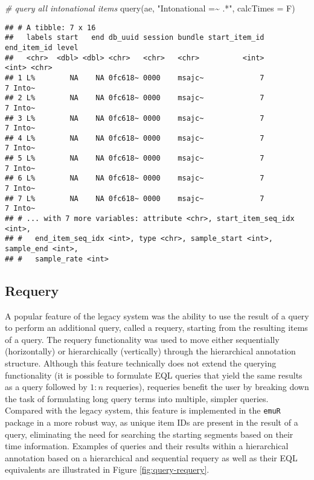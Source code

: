 \documentclass[
]{book}
\newenvironment{Shaded}{\begin{snugshade}}{\end{snugshade}}
\newcommand{\AttributeTok}[1]{\textcolor[rgb]{0.77,0.63,0.00}{#1}}
\newcommand{\CommentTok}[1]{\textcolor[rgb]{0.56,0.35,0.01}{\textit{#1}}}
\newcommand{\FunctionTok}[1]{\textcolor[rgb]{0.00,0.00,0.00}{#1}}
\newcommand{\NormalTok}[1]{#1}
\newcommand{\StringTok}[1]{\textcolor[rgb]{0.31,0.60,0.02}{#1}}
\begin{document}
\begin{Shaded}
\begin{Highlighting}[]
\CommentTok{\# query all intonational items}
\FunctionTok{query}\NormalTok{(ae, }\StringTok{"Intonational =\textasciitilde{} .*"}\NormalTok{, }\AttributeTok{calcTimes =}\NormalTok{ F)}
\end{Highlighting}
\end{Shaded}

\begin{verbatim}
## # A tibble: 7 x 16
##   labels start   end db_uuid session bundle start_item_id end_item_id level
##   <chr>  <dbl> <dbl> <chr>   <chr>   <chr>          <int>       <int> <chr>
## 1 L%        NA    NA 0fc618~ 0000    msajc~             7           7 Into~
## 2 L%        NA    NA 0fc618~ 0000    msajc~             7           7 Into~
## 3 L%        NA    NA 0fc618~ 0000    msajc~             7           7 Into~
## 4 L%        NA    NA 0fc618~ 0000    msajc~             7           7 Into~
## 5 L%        NA    NA 0fc618~ 0000    msajc~             7           7 Into~
## 6 L%        NA    NA 0fc618~ 0000    msajc~             7           7 Into~
## 7 L%        NA    NA 0fc618~ 0000    msajc~             7           7 Into~
## # ... with 7 more variables: attribute <chr>, start_item_seq_idx <int>,
## #   end_item_seq_idx <int>, type <chr>, sample_start <int>, sample_end <int>,
## #   sample_rate <int>
\end{verbatim}

\hypertarget{subsec:requery}{%
\subsection{Requery}\label{subsec:requery}}

A popular feature of the legacy system was the ability to use the result of a query to perform an additional query, called a requery, starting from the resulting items of a query. The requery functionality was used to move either sequentially (horizontally) or hierarchically (vertically) through the hierarchical annotation structure. Although this feature technically does not extend the querying functionality (it is possible to formulate EQL queries that yield the same results as a query followed by \(1:n\) requeries), requeries benefit the user by breaking down the task of formulating long query terms into multiple, simpler queries. Compared with the legacy system, this feature is implemented in the \texttt{emuR} package in a more robust way, as unique item IDs are present in the result of a query, eliminating the need for searching the starting segments based on their time information. Examples of queries and their results within a hierarchical annotation based on a hierarchical and sequential requery as well as their EQL equivalents are illustrated in Figure \ref{fig:query-requery}.
\end{document}
